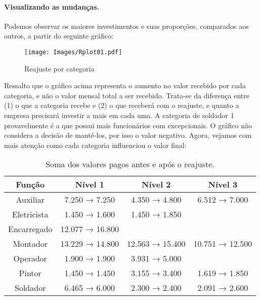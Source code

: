 \documentclass[a4paper, 12pt]{CSSullivanBusinessReport}
\begin{document}
\begin{fullwidth}

\paragraph{Visualizando as mudanças.} Podemos observar os maiores investimentos e suas proporções, comparados aos outros, a partir do seguinte gráfico:


\vspace{-0.3cm}
\begin{figure*}[H] 
	\texttt{[image: Images/Rplot01.pdf]}
	\caption{Reajuste por categoria}
	\label{fig:reajustecategoria} 
 \end{figure*}

\vspace{-0.7cm} %

Ressalto que o gráfico acima representa o aumento no valor recebido por cada categoria, e não o valor mensal total a ser recebido. Trata-se da diferença entre (1) o que a categoria recebe e (2) o que receberá com o reajuste, e quanto a empresa precisará investir a mais em cada uma. A categoria de soldador 1 provavelmente é a que possui mais funcionários com excepcionais. O gráfico não considera a decisão de mantê-los, por isso o valor negativo. Agora, vejamos com mais atenção como cada categoria influenciou o valor final:



\begin{table}[h]
    \centering
    \caption{Soma dos valores pagos antes e após o reajuste.}
        \begin{tabular}{|c|c|c|c|}
        \hline
        \textbf{Função} & \textbf{Nível 1} & \textbf{Nível 2} & \textbf{Nível 3} \\ \hline
        Auxiliar & 7.250 → 7.250 & 4.350 → 4.800 & 6.512 → 7.000 \\ \hline
        Eletricista & 1.450 → 1.600 & 1.450 → 1.850 & \\ \hline
        Encarregado & 12.077 → 16.800 & & \\ \hline
        Montador & 13.229 → 14.800 & 12.563 → 15.400 & 10.751 → 12.500 \\ \hline
        Operador & 1.900 → 1.900 & 3.931 → 5.000 & \\ \hline
        Pintor & 1.450 → 1.450 & 3.155 → 3.400 & 1.619 → 1.850 \\ \hline
        Soldador & 6.465 → 6.000 & 2.300 → 2.400 & 2.091 → 2.600 \\ \hline
    \end{tabular}
	\label{tab:reajuste}
\end{table}


\end{fullwidth}
\end{document}
